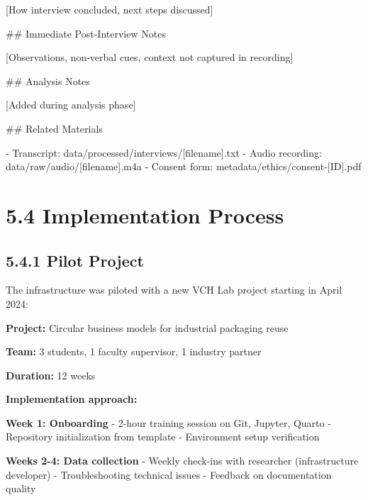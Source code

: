 \documentclass[
  oneside,
  open=any]{scrbook}
\newenvironment{Shaded}{\begin{snugshade}}{\end{snugshade}}
\newcommand{\CommentTok}[1]{\textcolor[rgb]{0.37,0.37,0.37}{#1}}
\newcommand{\FunctionTok}[1]{\textcolor[rgb]{0.28,0.35,0.67}{#1}}
\newcommand{\InformationTok}[1]{\textcolor[rgb]{0.37,0.37,0.37}{#1}}
\newcommand{\NormalTok}[1]{\textcolor[rgb]{0.00,0.23,0.31}{#1}}
\newcommand{\OtherTok}[1]{\textcolor[rgb]{0.00,0.23,0.31}{#1}}
\newcommand{\SpecialStringTok}[1]{\textcolor[rgb]{0.13,0.47,0.30}{#1}}
\begin{document}
\begin{Shaded}
\begin{Highlighting}[]
\CommentTok{[}\OtherTok{How interview concluded, next steps discussed}\CommentTok{]}

\FunctionTok{\#\# Immediate Post{-}Interview Notes}

\CommentTok{[}\OtherTok{Observations, non{-}verbal cues, context not captured in recording}\CommentTok{]}

\FunctionTok{\#\# Analysis Notes}

\CommentTok{[}\OtherTok{Added during analysis phase}\CommentTok{]}

\FunctionTok{\#\# Related Materials}

\SpecialStringTok{{-} }\NormalTok{Transcript: }\InformationTok{\textasciigrave{}data/processed/interviews/[filename].txt\textasciigrave{}}
\SpecialStringTok{{-} }\NormalTok{Audio recording: }\InformationTok{\textasciigrave{}data/raw/audio/[filename].m4a\textasciigrave{}}
\SpecialStringTok{{-} }\NormalTok{Consent form: }\InformationTok{\textasciigrave{}metadata/ethics/consent{-}[ID].pdf\textasciigrave{}}
\end{Highlighting}
\end{Shaded}

\section{5.4 Implementation Process}\label{implementation-process}

\subsection{5.4.1 Pilot Project}\label{pilot-project}

The infrastructure was piloted with a new VCH Lab project starting in
April 2024:

\textbf{Project:} Circular business models for industrial packaging
reuse

\textbf{Team:} 3 students, 1 faculty supervisor, 1 industry partner

\textbf{Duration:} 12 weeks

\textbf{Implementation approach:}

\textbf{Week 1: Onboarding} - 2-hour training session on Git, Jupyter,
Quarto - Repository initialization from template - Environment setup
verification

\textbf{Weeks 2-4: Data collection} - Weekly check-ins with researcher
(infrastructure developer) - Troubleshooting technical issues - Feedback
on documentation quality
\end{document}
